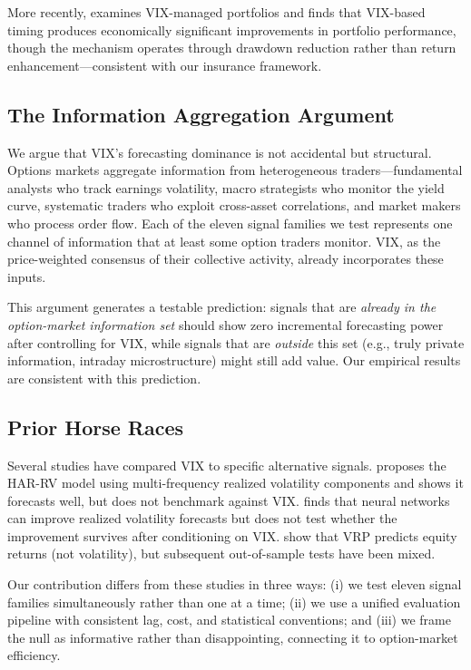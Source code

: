 \documentclass[12pt,a4paper]{article}
\begin{document}
More recently, \citet{bozovic2024} examines VIX-managed portfolios and finds that VIX-based timing produces economically significant improvements in portfolio performance, though the mechanism operates through drawdown reduction rather than return enhancement---consistent with our insurance framework.

\subsection{The Information Aggregation Argument}

We argue that VIX's forecasting dominance is not accidental but structural. Options markets aggregate information from heterogeneous traders---fundamental analysts who track earnings volatility, macro strategists who monitor the yield curve, systematic traders who exploit cross-asset correlations, and market makers who process order flow. Each of the eleven signal families we test represents one channel of information that at least some option traders monitor. VIX, as the price-weighted consensus of their collective activity, already incorporates these inputs.

This argument generates a testable prediction: signals that are \emph{already in the option-market information set} should show zero incremental forecasting power after controlling for VIX, while signals that are \emph{outside} this set (e.g., truly private information, intraday microstructure) might still add value. Our empirical results are consistent with this prediction.

\subsection{Prior Horse Races}

Several studies have compared VIX to specific alternative signals. \citet{corsi2009} proposes the HAR-RV model using multi-frequency realized volatility components and shows it forecasts well, but does not benchmark against VIX. \citet{bucci2020} finds that neural networks can improve realized volatility forecasts but does not test whether the improvement survives after conditioning on VIX. \citet{bollerslev2009} show that VRP predicts equity returns (not volatility), but subsequent out-of-sample tests have been mixed.

Our contribution differs from these studies in three ways: (i) we test eleven signal families simultaneously rather than one at a time; (ii) we use a unified evaluation pipeline with consistent lag, cost, and statistical conventions; and (iii) we frame the null as informative rather than disappointing, connecting it to option-market efficiency.
\end{document}
